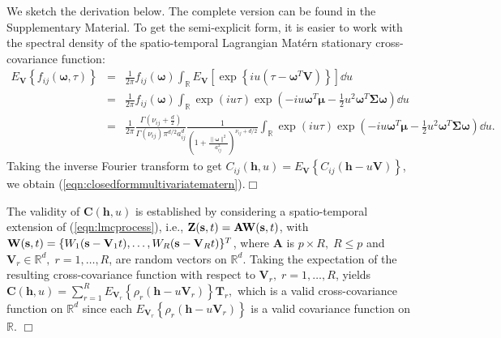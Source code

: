 \documentclass[12pt]{article}
\newcommand{\0}{\mathbf{0}}
\begin{document}
We sketch the derivation below. The complete version can be found in the Supplementary Material. To get the semi-explicit form, it is easier to work with the spectral density of the spatio-temporal Lagrangian Mat\'{e}rn stationary cross-covariance function:
\begin{eqnarray*}
E_{\mathbf{V}}\left\{f_{ij}(\boldsymbol{\omega},\tau)\right\} &=&\frac{1}{2\pi} f_{ij}(\boldsymbol{\omega})  \int_{\mathbb{R}} E_{\mathbf{V}}\left[\exp\left\{iu\left(\tau-\boldsymbol{\omega}^T\mathbf{V}\right) \right\}\right]\dd u \nonumber \\
&=&\frac{1}{2\pi} f_{ij}(\boldsymbol{\omega})  \int_{\mathbb{R}} \exp(iu\tau) \exp\left(-iu\boldsymbol{\omega}^T\boldsymbol{\mu}-\frac{1}{2}u^2\boldsymbol{\omega}^T\boldsymbol{\Sigma}\boldsymbol{\omega}\right) \dd u \nonumber \\
&=&\frac{1}{2\pi}\frac{\Gamma\left(\nu_{ij}+\frac{d}{2}\right)}{\Gamma\left(\nu_{ij}\right)\pi^{d/2}a_{ij}^{d}} \frac{1}{\left(1+\frac{\|\boldsymbol{\omega}\|^2}{a_{ij}^2}\right)^{\nu_{ij}+d/2}} \int_{\mathbb{R}} \exp(iu\tau) \exp\left(-iu\boldsymbol{\omega}^T\boldsymbol{\mu}-\frac{1}{2}u^2\boldsymbol{\omega}^T\boldsymbol{\Sigma}\boldsymbol{\omega}\right) \dd u.
\end{eqnarray*}
Taking the inverse Fourier transform to get $C_{ij}(\mathbf{h},u)=E_{\mathbf{V}}\left\{C_{ij}\left(\mathbf{h}-u\mathbf{V}\right)\right\}$, we obtain (\ref{eqn:closedformmultivariatematern}).\hfill $\Box$
\vspace{.2cm}


The validity of $\mathbf{C}(\mathbf{h}, u)$ is established by considering a spatio-temporal extension of (\ref{eqn:lmcprocess}), i.e.,
$\mathbf{Z}(\mathbf{s},t)=\mathbf{A} {\bf W}(\mathbf{s},t)$, with ${\bf W}(\mathbf{s},t)=\{W_{1}(\mathbf{s}-\mathbf{V}_1t),\ldots,W_{R}(\mathbf{s}-\mathbf{V}_R t)\}^T$,
where $\mathbf{A}$ is $p\times R,\;R\leq p$ and $\mathbf{V}_{r}\in \mathbb{R}^d,\;r=1,\ldots,R$, are random vectors on $\mathbb{R}^d$. Taking the expectation of the resulting cross-covariance function with respect to $\mathbf{V}_{r},\;r=1,\ldots,R$, yields
$
\mathbf{C}(\mathbf{h}, u)=\sum_{r=1}^{R} E_{\mathbf{V}_r}\left\{\rho_r(\mathbf{h}-u\mathbf{V}_r)\right\} \mathbf{T}_r,
$
which is a valid cross-covariance function on $\mathbb{R}^d$ since each $E_{\mathbf{V}_r}\left\{\rho_r(\mathbf{h}-u\mathbf{V}_r)\right\}$ is a valid covariance function on $\mathbb{R}$. \hfill $\Box$
\vspace{.2cm}
\end{document}
